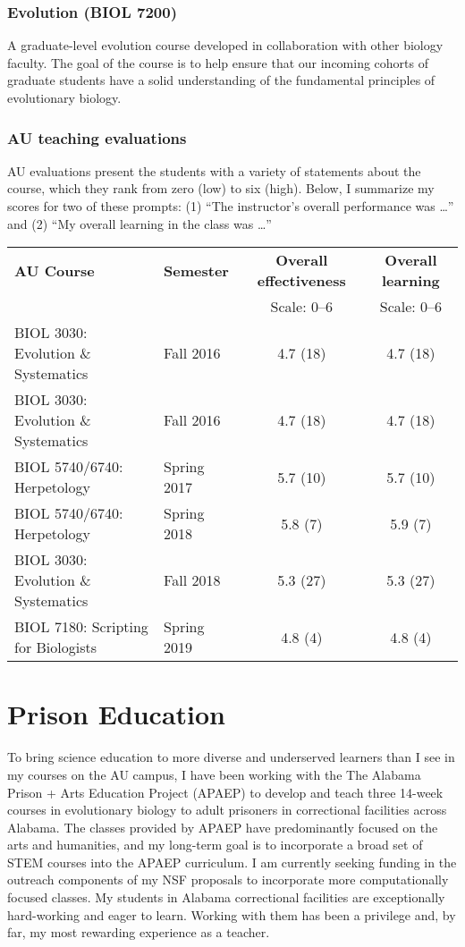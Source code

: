 \subsubsection*{Evolution (BIOL 7200)}
A graduate-level evolution course developed in collaboration with other biology
faculty.
The goal of the course is to help ensure that our incoming cohorts of graduate
students have a solid understanding of the fundamental principles of
evolutionary biology.

\subsubsection*{AU teaching evaluations}
AU evaluations present the students with a variety of statements about the
course,
which they rank from zero (low) to six (high).
Below, I summarize my scores for two of these prompts:
(1) ``The instructor's overall performance was \ldots''
and
(2) ``My overall learning in the class was \ldots''
\begin{center}
\begin{tabular}{l l c c}
    \hline
    \textbf{AU Course} & \textbf{Semester} & \textbf{Overall effectiveness} & \textbf{Overall learning} \\
                       &                   & Scale: 0--6                    & Scale: 0--6 \\
    \hline
    BIOL 3030: Evolution \& Systematics & Fall 2016 & 4.7 (18) & 4.7 (18) \\
    BIOL 3030: Evolution \& Systematics & Fall 2016 & 4.7 (18) & 4.7 (18) \\
    BIOL 5740/6740: Herpetology & Spring 2017 & 5.7 (10) & 5.7 (10) \\
    BIOL 5740/6740: Herpetology & Spring 2018 & 5.8 (7) & 5.9 (7) \\
    BIOL 3030: Evolution \& Systematics & Fall 2018 & 5.3 (27) & 5.3 (27) \\
    BIOL 7180: Scripting for Biologists & Spring 2019 & 4.8 (4) & 4.8 (4) \\
    \hline
\end{tabular}
\end{center}

\section*{Prison Education}
To bring science education to more diverse and underserved learners than
I see in my courses on the AU campus,
I have been working with the
The Alabama Prison + Arts Education Project (APAEP) to develop and teach three
14-week courses in evolutionary biology to adult prisoners in correctional
facilities across Alabama.
The classes provided by APAEP have predominantly focused on the
arts and humanities, and
my long-term goal is to incorporate a broad set of STEM courses into the APAEP
curriculum.
I am currently seeking funding in the outreach components of my NSF proposals
to incorporate more computationally focused classes.
My students in Alabama correctional facilities are exceptionally hard-working
and eager to learn.
Working with them has been a privilege and, by far, my most rewarding
experience as a teacher.

